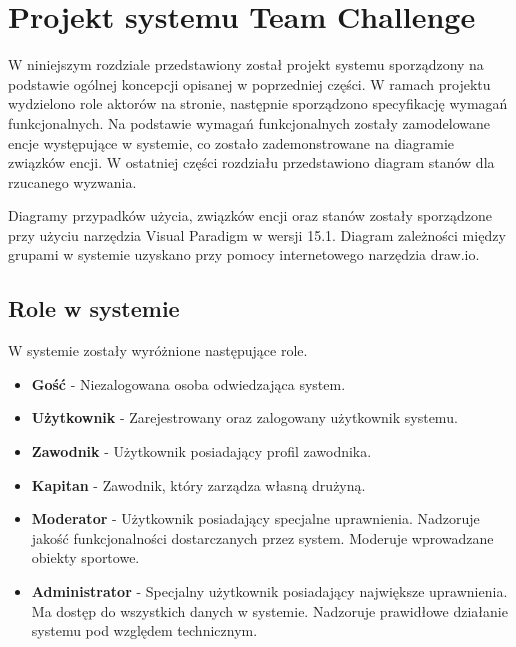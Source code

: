 \chapter{Projekt systemu Team Challenge}

W niniejszym rozdziale przedstawiony został projekt systemu sporządzony na podstawie ogólnej koncepcji opisanej w poprzedniej części. W ramach projektu wydzielono role aktorów na stronie, następnie sporządzono specyfikację wymagań funkcjonalnych. Na podstawie wymagań funkcjonalnych zostały zamodelowane encje występujące w systemie, co zostało zademonstrowane na diagramie związków encji. W ostatniej części rozdziału przedstawiono diagram stanów dla rzucanego wyzwania.

Diagramy przypadków użycia, związków encji oraz stanów zostały sporządzone przy użyciu narzędzia Visual Paradigm w wersji 15.1. Diagram zależności między grupami w systemie uzyskano przy pomocy internetowego narzędzia draw.io.

\section{Role w systemie}

W systemie zostały wyróżnione następujące role. 

\begin{itemize}

\item \textbf{Gość} - Niezalogowana osoba odwiedzająca system.  

\item \textbf{Użytkownik} - Zarejestrowany oraz zalogowany użytkownik systemu.

\item \textbf{Zawodnik} - Użytkownik posiadający profil zawodnika.  

\item \textbf{Kapitan} - Zawodnik, który zarządza własną drużyną. 

\item \textbf{Moderator} - Użytkownik posiadający specjalne uprawnienia. Nadzoruje jakość funkcjonalności dostarczanych przez system. Moderuje wprowadzane obiekty sportowe.    

\item \textbf{Administrator} - Specjalny użytkownik posiadający największe uprawnienia. Ma dostęp do wszystkich danych w systemie. Nadzoruje prawidłowe działanie systemu pod względem technicznym.  

\end{itemize}



